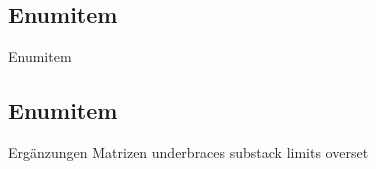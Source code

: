 \documentclass["WS\space 16-17\space -\space LaTeX-Kurs\space -\space Praesentation\space -\space 4.tex"]{subfiles}
\begin{document}
\subsection{Enumitem}
\begin{frame}[c]
	\begin{center}
		\large Enumitem
	\end{center}
\end{frame}




\subsection{Enumitem}
\begin{frame}[c]
	\begin{center}
		\large Ergänzungen Matrizen  underbraces substack limits overset 
	\end{center}
\end{frame}

\end{document}
